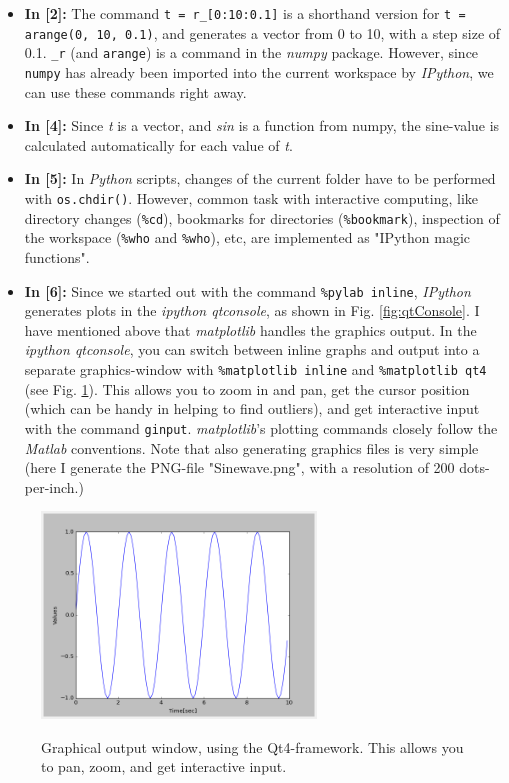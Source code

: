 \begin{itemize}
  \item \textbf{In [2]:} The command \lstinline{t = r_[0:10:0.1]} is a shorthand version for \lstinline{t = arange(0, 10, 0.1)}, and generates a vector from 0 to 10, with a step size of 0.1.  \lstinline{_r} (and \lstinline{arange}) is a command in the \emph{numpy}  package. However, since \lstinline{numpy} has already been imported into the current workspace by \emph{IPython}, we can use these commands right away.
  \item \textbf{In [4]:} Since \emph{t} is a vector, and \emph{sin} is a function from numpy, the sine-value is calculated automatically for each value of \emph{t}.
  \item \textbf{In [5]:} In \emph{Python} scripts, changes of the current folder have to be performed with \lstinline{os.chdir()}. However, common task with interactive computing, like directory changes (\lstinline{%cd}), bookmarks for directories (\lstinline{%bookmark}), inspection of the workspace (\lstinline{%who} and \lstinline{%who}), etc, are implemented as "IPython magic functions".
  \item \textbf{In [6]:} Since we started out with the command \lstinline{%pylab inline}, \emph{IPython} generates plots in the \emph{ipython qtconsole}, as shown in Fig. \ref{fig:qtConsole}. I have mentioned above that \emph{matplotlib} handles the graphics output. In the \emph{ipython qtconsole}, you can switch between inline graphs and output into a separate graphics-window with \lstinline{%matplotlib inline} and \lstinline{%matplotlib qt4} (see Fig. \ref{fig:qt4}). This allows you to zoom in and pan, get the cursor position (which can be handy in helping to find outliers), and get interactive input with the command \lstinline{ginput}. \emph{matplotlib}'s plotting commands closely follow the \emph{Matlab} conventions. Note that also generating graphics files is very simple (here I generate the PNG-file "Sinewave.png", with a resolution of 200 dots-per-inch.)
\end{itemize}

\begin{figure}
  \centering
  \includegraphics[width=0.65\textwidth]{../Images/qt4.png}\\
  \caption{Graphical output window, using the Qt4-framework. This allows you to pan, zoom, and get interactive input.}
  \label{fig:qt4}
\end{figure}


